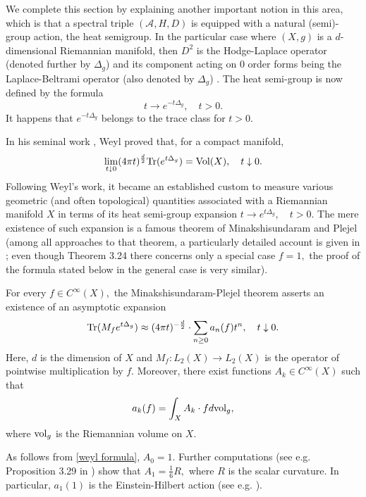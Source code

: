 \documentclass[12pt]{article}
\begin{document}
We complete this section by explaining another important notion in this area, which is that a spectral triple $(\mathcal{A},H,D)$ is equipped with a natural (semi)-group action, the heat semigroup. In the particular case where $(X,g)$ is a $d$-dimensional Riemannian manifold, then $D^2$ is the Hodge-Laplace operator (denoted further by $\Delta_g$) and its component acting on $0$ order forms being the Laplace-Beltrami operator (also denoted by $\Delta_g$) \cite{Rosenberg}. The heat semi-group is now defined by the formula
$$t\to e^{-t\Delta_g},\quad t>0.$$
It happens that $e^{-t\Delta_g}$ belongs to the trace class for $t>0.$

In his seminal work \cite{Weyl}, Weyl proved that, for a compact manifold,
\begin{equation}\label{weyl formula}
\lim_{t\downarrow0}(4\pi t)^{\frac{d}{2}}{\rm Tr}(e^{t\Delta_g})={\rm Vol}(X),\quad t\downarrow0.
\end{equation}
Following Weyl's work, it became an established custom to measure various geometric (and often topological) quantities associated with a Riemannian manifold $X$ in terms of its heat semi-group expansion $t\to e^{t\Delta_g},\quad t>0.$ The mere existence of such expansion is a famous theorem of Minakshisundaram and Plejel (among all approaches to that theorem, a particularly detailed account is given in \cite{Rosenberg}; even though Theorem 3.24 there concerns only a special case $f=1,$ the proof of the formula stated below in the general case is very similar). 

For every $f\in C^{\infty}(X),$ the Minakshisundaram-Plejel theorem asserts an existence of an asymptotic expansion 
\begin{equation}\label{heat asymptotic}
{\rm Tr}(M_fe^{t\Delta_g})\approx (4\pi t)^{-\frac{d}{2}}\cdot \sum_{n\geq0}a_n(f)t^n,\quad t\downarrow0.
\end{equation}
Here, $d$ is the dimension of $X$ and $M_f:L_2(X)\to L_2(X)$ is the operator of pointwise multiplication by $f.$ Moreover, there exist functions $A_k\in C^{\infty}(X)$ such that
\begin{equation}\label{normality of coefficients}
a_k(f)=\int_X A_k\cdot f d{\rm vol}_g,
\end{equation}
where ${\rm vol}_g$ is the Riemannian volume on $X.$

As follows from \eqref{weyl formula}, $A_0=1.$ Further computations (see e.g. Proposition 3.29 in \cite{Rosenberg}) show that $A_1=\frac16 R,$ where $R$ is the scalar curvature. In particular, $a_1(1)$ is the Einstein-Hilbert action (see e.g. \cite{Connes-book}).
\end{document}
